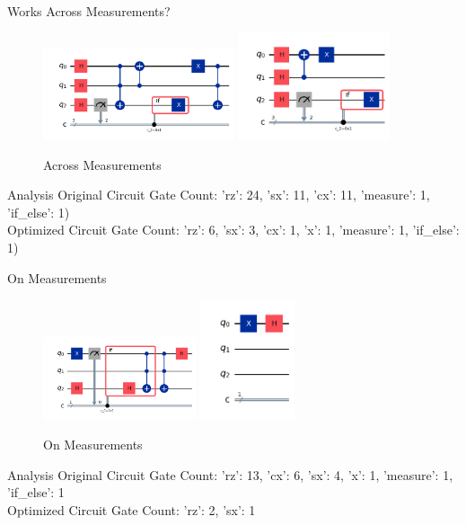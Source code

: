 \documentclass[10pt]{beamer}
\begin{document}

\begin{frame}{Works Across Measurements?}
  \begin{figure}
    \centering
    \includegraphics[width=0.5\textwidth]{Images/meas_1.png}
    \includegraphics[width=0.4\textwidth]{Images/meas_2.png}
    \caption{Across Measurements}
  \end{figure}

  \begin{block}{Analysis}
    Original Circuit Gate Count: {'rz': 24, 'sx': 11, 'cx': 11, 'measure': 1, 'if\_else': 1}) \\
    Optimized Circuit Gate Count: {'rz': 6, 'sx': 3, 'cx': 1, 'x': 1, 'measure': 1, 'if\_else': 1})
  \end{block}
\end{frame}


\begin{frame}{On Measurements}
  \begin{figure}
    \centering
    \includegraphics[width=0.4\textwidth]{Images/meas_3.png}
    \includegraphics[width=0.25\textwidth]{Images/meas_4.png}
    \caption{On Measurements}
  \end{figure}

  \begin{block}{Analysis}
    Original Circuit Gate Count: {'rz': 13, 'cx': 6, 'sx': 4, 'x': 1, 'measure': 1, 'if\_else': 1} \\
    Optimized Circuit Gate Count: {'rz': 2, 'sx': 1}
  \end{block}
\end{frame}
\end{document}
